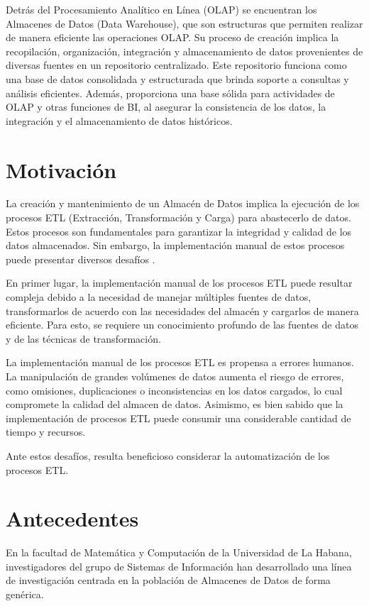 Detrás del Procesamiento Analítico en Línea (OLAP) se encuentran los Almacenes de Datos (Data Warehouse), que son 
estructuras que permiten realizar de manera eficiente las operaciones OLAP. Su proceso de creaci\'on implica la 
recopilación, 
organización, integración y almacenamiento de datos provenientes de diversas fuentes en un repositorio centralizado. Este 
repositorio funciona como una base de datos consolidada y estructurada que brinda soporte a consultas y análisis eficientes. 
Además, proporciona una base sólida para actividades de OLAP y otras funciones de BI, al 
asegurar la consistencia de los datos, la integración y el almacenamiento de datos históricos.

\section{Motivaci\'on}

La creación y mantenimiento de un Almacén de Datos implica la ejecución de los procesos ETL (Extracción, Transformación y 
Carga) para abastecerlo de datos. Estos procesos son fundamentales para garantizar la integridad y calidad de los datos 
almacenados. Sin embargo, la implementación manual de estos procesos puede presentar diversos desafíos
\cite{nwokeji2021systematic, dhaouadi2022data, kimball2004data}.

En primer lugar, la implementación manual de los procesos ETL puede resultar compleja debido a la necesidad 
de manejar múltiples fuentes de datos, transformarlos de acuerdo con las necesidades del almacén y cargarlos de manera 
eficiente. Para esto, se requiere un conocimiento profundo de las fuentes de datos y de las técnicas de transformación.

La implementación manual de los procesos ETL es propensa a errores humanos. La manipulación de grandes 
volúmenes de datos aumenta el riesgo de errores, como omisiones, duplicaciones o inconsistencias en los datos cargados, lo 
cual compromete la calidad del almacen de datos. Asimismo, es bien sabido que la implementación de procesos ETL puede consumir una 
considerable cantidad de tiempo y recursos. 

Ante estos desafíos, resulta beneficioso considerar la automatización de los procesos ETL.

\section{Antecedentes}

En la facultad de Matemática y Computación de la Universidad de La Habana, investigadores del grupo de Sistemas de 
Información han desarrollado una línea de investigación centrada en la poblaci\'on de Almacenes de Datos de forma gen\'erica. 

